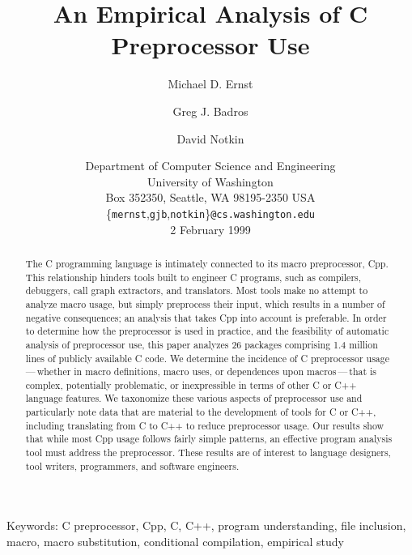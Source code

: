 \documentclass[10pt]{article}
\def\numpackages{26}
\def\numlinesalmost{1.4 million}
\begin{document}
% 


\title{An Empirical Analysis of C Preprocessor Use}

\author{Michael D. Ernst \and Greg J. Badros \and David Notkin}

\date{%
Department of Computer Science and Engineering \\
University of Washington \\
Box 352350, Seattle, WA  98195-2350  USA \\
{\small \{{\tt mernst},{\tt gjb},{\tt notkin}\}{\tt @cs.washington.edu}} \\
2 February 1999}  

\maketitle

\begin{abstract}
  The C programming language is intimately connected to its macro
  preprocessor, Cpp.  This relationship hinders tools built to engineer C
  programs, such as compilers, debuggers, call graph extractors, and
  translators.  Most tools make no attempt to analyze macro usage, but
  simply preprocess their input, which results in a number of negative
  consequences; an analysis that takes Cpp into account is preferable.  In
  order to determine how the preprocessor is used in practice, and the
  feasibility of automatic analysis of preprocessor use, this paper
  analyzes {\numpackages} packages comprising {\numlinesalmost} lines of publicly
  available C code.  We determine the incidence of C preprocessor
  usage\,---\,whether in macro definitions, macro uses, or dependences upon
  macros\,---\,that is complex, potentially problematic, or inexpressible
  in terms of other C or C++ language features.  We taxonomize these
  various aspects of preprocessor use and particularly note data that are
  material to the development of tools for C or C++, including translating
  from C to C++ to reduce preprocessor usage.  Our results show that while
  most Cpp usage follows fairly simple patterns, an effective program
  analysis tool must address the preprocessor.
  These results are of interest to language designers, tool writers,
  programmers, and software engineers.
\end{abstract}

\noindent
Keywords: C preprocessor, Cpp, C, C++, program understanding, file
inclusion, macro, macro substitution, conditional compilation, empirical study
\end{document}
